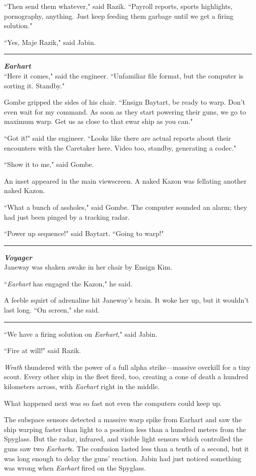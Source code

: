 \documentclass[twoside,letterpaper,12pt]{memoir}
\begin{document}
``Then send them whatever," said Razik. ``Payroll reports, sports highlights, pornography, anything. Just keep feeding them garbage until we get a firing solution."

``Yes, Maje Razik," said Jabin.

\fancybreak{\rule{3cm}{0.4 pt}}
\noindent\textit{\textbf{Earhart}}\\

``Here it comes," said the engineer. ``Unfamiliar file format, but the computer is sorting it. Standby."

Gombe gripped the sides of his chair. ``Ensign Baytart, be ready to warp. Don't even wait for my command. As soon as they start powering their guns, we go to maximum warp. Get us as close to that ewar ship as you can."

``Got it!" said the engineer. ``Looks like there are actual reports about their encounters with the Caretaker here. Video too, standby, generating a codec."

``Show it to me," said Gombe.

An inset appeared in the main viewscreen. A naked Kazon was fellating another naked Kazon.

``What a bunch of assholes," said Gombe. The computer sounded an alarm; they had just been pinged by a tracking radar.

``Power up sequence!" said Baytart. ``Going to warp!"

\fancybreak{\rule{3cm}{0.4 pt}}
\noindent\textit{\textbf{Voyager}}\\

Janeway was shaken awake in her chair by Ensign Kim.

``\textit{Earhart} has engaged the Kazon," he said.

A feeble squirt of adrenaline hit Janeway's brain. It woke her up, but it wouldn't last long. ``On screen," she said.

\fancybreak{\rule{3cm}{0.4 pt}}
``We have a firing solution on \textit{Earhart}," said Jabin.

``Fire at will!" said Razik.

\textit{Wrath} thundered with the power of a full alpha strike---massive overkill for a tiny scout. Every other ship in the fleet fired, too, creating a cone of death a hundred kilometers across, with \textit{Earhart} right in the middle.

What happened next was so fast not even the computers could keep up.

The subspace sensors detected a massive warp spike from Earhart and saw the ship warping faster than light to a position less than a hundred meters from the Spyglass. But the radar, infrared, and visible light sensors which controlled the guns saw two \textit{Earhart}s. The confusion lasted less than a tenth of a second, but it was long enough to delay the guns' reaction. Jabin had just noticed something was wrong when \textit{Earhart} fired on the Spyglass.
\end{document}
